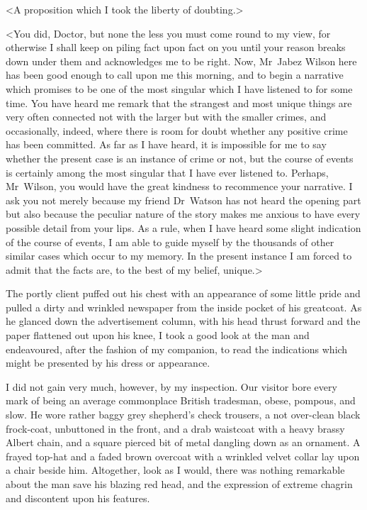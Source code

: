 <A proposition which I took the liberty of doubting.>

<You did, Doctor, but none the less you must come round to my view, for otherwise I shall keep on piling fact upon fact on you until your reason breaks down under them and acknowledges me to be right. Now, Mr~Jabez Wilson here has been good enough to call upon me this morning, and to begin a narrative which promises to be one of the most singular which I have listened to for some time. You have heard me remark that the strangest and most unique things are very often connected not with the larger but with the smaller crimes, and occasionally, indeed, where there is room for doubt whether any positive crime has been committed. As far as I have heard, it is impossible for me to say whether the present case is an instance of crime or not, but the course of events is certainly among the most singular that I have ever listened to. Perhaps, Mr~Wilson, you would have the great kindness to recommence your narrative. I ask you not merely because my friend Dr~Watson has not heard the opening part but also because the peculiar nature of the story makes me anxious to have every possible detail from your lips. As a rule, when I have heard some slight indication of the course of events, I am able to guide myself by the thousands of other similar cases which occur to my memory. In the present instance I am forced to admit that the facts are, to the best of my belief, unique.>

The portly client puffed out his chest with an appearance of some little pride and pulled a dirty and wrinkled newspaper from the inside pocket of his greatcoat. As he glanced down the advertisement column, with his head thrust forward and the paper flattened out upon his knee, I took a good look at the man and endeavoured, after the fashion of my companion, to read the indications which might be presented by his dress or appearance.

I did not gain very much, however, by my inspection. Our visitor bore every mark of being an average commonplace British tradesman, obese, pompous, and slow. He wore rather baggy grey shepherd's check trousers, a not over-clean black frock-coat, unbuttoned in the front, and a drab waistcoat with a heavy brassy Albert chain, and a square pierced bit of metal dangling down as an ornament. A frayed top-hat and a faded brown overcoat with a wrinkled velvet collar lay upon a chair beside him. Altogether, look as I would, there was nothing remarkable about the man save his blazing red head, and the expression of extreme chagrin and discontent upon his features.

